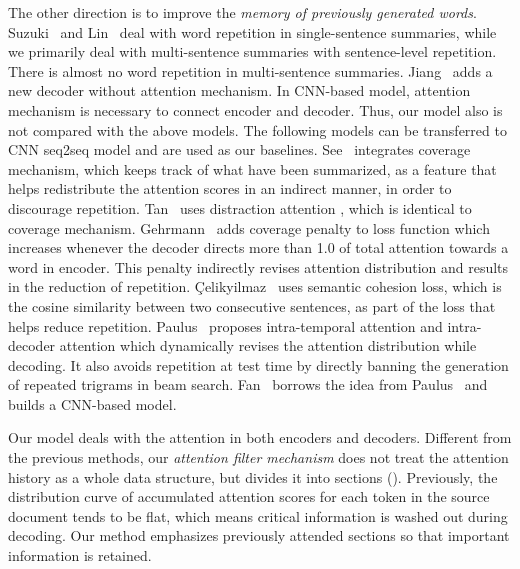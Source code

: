 The other direction is to improve the 
{\em memory of previously generated words}.
Suzuki~\cite{SuzukiN17} and Lin~\cite{LinSMS18} 
deal with word repetition in single-sentence summaries, 
while we primarily deal with multi-sentence summaries with 
sentence-level repetition. 
There is almost no word repetition in multi-sentence summaries.
Jiang~\cite{JiangB18} adds a new decoder without attention mechanism.
In CNN-based model, attention mechanism is necessary to connect encoder 
and decoder.
Thus, our model also is not compared with the above models. 
The following models can be transferred to CNN seq2seq model and
are used as our baselines.
See~\cite{SeeLM17} integrates coverage mechanism, 
which keeps track of what have been summarized, as a feature that helps 
redistribute the attention scores in an indirect manner,
in order to discourage repetition. 
Tan~\cite{TanWX17} uses distraction attention
\cite{ChenZLWJ16}, which is identical to coverage mechanism. 
Gehrmann~\cite{GehrmannDR18} adds coverage penalty to loss function
which increases whenever the decoder directs more than 1.0 of total attention
towards a word in encoder.
This penalty indirectly revises attention distribution and results in
the reduction of repetition.
{\c{C}}elikyilmaz~\cite{elikyilmazBHC18} uses semantic cohesion loss,
which is the cosine similarity between two consecutive sentences, as part of
the loss that helps reduce repetition.
Paulus~\cite{PaulusXS17} proposes intra-temporal attention \cite{NallapatiZSGX16} and 
intra-decoder attention which dynamically revises the attention distribution while decoding. 
It also avoids repetition at test time by directly banning the generation of 
repeated trigrams in beam search. 
Fan~\cite{FanGA18} borrows the idea from Paulus~\cite{PaulusXS17} and 
builds a CNN-based model. 

Our model deals with the attention in both encoders and decoders. 
Different from the previous methods, 
our \textit{attention filter mechanism} does not 
treat the attention history as a whole data structure,  
but divides it into sections (). 
Previously, the distribution curve of accumulated attention scores 
for each token in the source document tends to be flat, 
which means critical information is washed out during decoding.
Our method emphasizes previously attended sections 
so that important information is retained.

